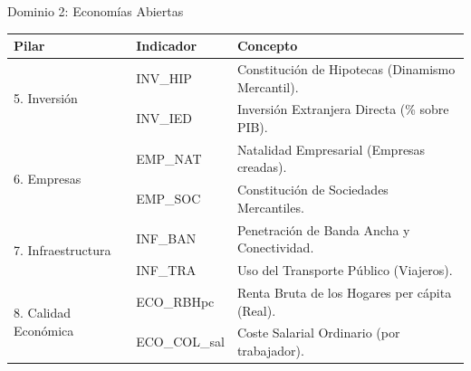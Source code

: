 \documentclass[10pt, aspectratio=169]{beamer}
\begin{document}
\begin{frame}{Dominio 2: Economías Abiertas}
    \begin{table}
        \centering
        \footnotesize
        \begin{tabular}{llp{7cm}}
            \toprule
            \textbf{Pilar} & \textbf{Indicador} & \textbf{Concepto} \\
            \midrule
            \multirow{2}{*}{5. Inversión} & INV\_HIP & Constitución de Hipotecas (Dinamismo Mercantil). \\
             & INV\_IED & Inversión Extranjera Directa (\% sobre PIB). \\
            \midrule
            \multirow{2}{*}{6. Empresas} & EMP\_NAT & Natalidad Empresarial (Empresas creadas). \\
             & EMP\_SOC & Constitución de Sociedades Mercantiles. \\
            \midrule
            \multirow{2}{*}{7. Infraestructura} & INF\_BAN & Penetración de Banda Ancha y Conectividad. \\
             & INF\_TRA & Uso del Transporte Público (Viajeros). \\
            \midrule
            \multirow{2}{*}{8. Calidad Económica} & ECO\_RBHpc & Renta Bruta de los Hogares per cápita (Real). \\
             & ECO\_COL\_sal & Coste Salarial Ordinario (por trabajador). \\
            \bottomrule
        \end{tabular}
    \end{table}
\end{frame}
\end{document}
